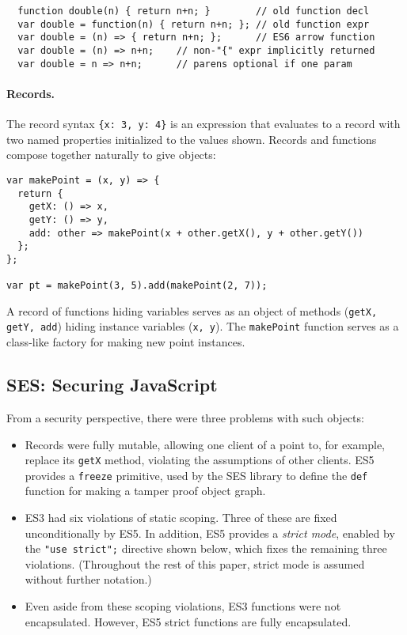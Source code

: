 \documentclass{llncs}
\begin{document}
\begin{verbatim}
  function double(n) { return n+n; }        // old function decl
  var double = function(n) { return n+n; }; // old function expr
  var double = (n) => { return n+n; };      // ES6 arrow function
  var double = (n) => n+n;    // non-"{" expr implicitly returned
  var double = n => n+n;      // parens optional if one param
\end{verbatim}

\paragraph{Records.} The record syntax {\tt \{x: 3, y: 4\}} is an expression that evaluates to a record with two named properties initialized to the values shown. Records and functions compose together naturally to give objects:

\begin{verbatim}
var makePoint = (x, y) => {
  return {
    getX: () => x,
    getY: () => y,
    add: other => makePoint(x + other.getX(), y + other.getY())
  };
};

var pt = makePoint(3, 5).add(makePoint(2, 7));
\end{verbatim}

A record of functions hiding variables serves as an object of methods ({\tt getX, getY, add}) hiding instance variables ({\tt x, y}). The {\tt makePoint} function serves as a class-like factory for making new point instances.


\subsection{SES: Securing JavaScript}




From a security perspective, there were three problems with such objects: 
\begin{itemize}
\item Records were fully mutable, allowing one client of a point to, for example, replace its {\tt getX} method, violating the assumptions of other clients. ES5 provides a {\tt freeze} primitive, used by the SES library to define the {\tt def} function for making a tamper proof object graph.
\item ES3 had six violations of static scoping. Three of these are fixed unconditionally by ES5. In addition, ES5 provides a \emph{strict mode}, enabled by the {\tt "use strict";} directive shown below, which fixes the remaining three violations. (Throughout the rest of this paper, strict mode is assumed without further notation.)  
\item Even aside from these scoping violations, ES3 functions were not encapsulated. However, ES5 strict functions are fully encapsulated.
\end{itemize}
\end{document}
